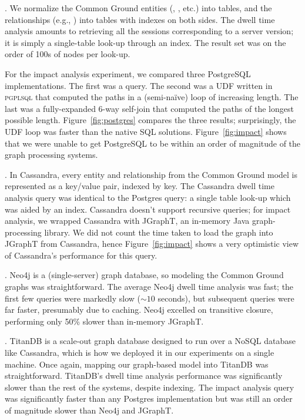 \documentclass{cidr-2017}
\begin{document}
. We normalize the Common Ground entities 
(\itemground, \version, etc.) into tables, and the relationships
(e.g., ) into tables with indexes on both sides. 
The dwell time analysis amounts to retrieving all the sessions corresponding to a server version; it is simply a single-table look-up through an index. The result set was on the order of 100s of nodes per look-up.

For the impact analysis experiment, we compared three PostgreSQL implementations. The first was a  query. 
The second was a UDF written in \textsc{pgplsql} that computed the paths in a (semi-naïve) loop of increasing length. 
The last was a fully-expanded 6-way self-join that computed the paths of the longest possible length. Figure~\ref{fig:postgres} compares the three results; surprisingly, the UDF loop was faster than the native SQL solutions. 
Figure~\ref{fig:impact} shows that we were unable to get PostgreSQL to be within an order of magnitude of the graph processing systems. 

. In Cassandra, every entity and relationship from the Common Ground model is represented as a key/value pair, indexed by key. 
The Cassandra dwell time analysis query was identical to the Postgres query: a single table look-up which was aided by an index.
Cassandra doesn't support recursive queries; for impact analysis, we wrapped Cassandra with JGraphT, an in-memory Java graph-processing library. We did not count the time taken to load the graph into JGraphT from Cassandra, hence Figure~\ref{fig:impact} shows a very optimistic view of Cassandra's performance for this query.

. Neo4j is a (single-server) graph database, so modeling the Common Ground graphs was straightforward.
The average Neo4j dwell time analysis was fast; the first few queries were markedly slow
(${\sim}10$ seconds),
but subsequent queries were far faster, presumably due to caching. 
Neo4j excelled on transitive closure, performing only 50\% slower than in-memory JGraphT.

. TitanDB is a scale-out graph database designed to run over a NoSQL database like Cassandra, which is how we deployed it in our experiments on a single machine. 
Once again, mapping our graph-based model into TitanDB was straightforward.
TitanDB's dwell time analysis performance was significantly slower than the rest of the systems, despite indexing.
The impact analysis query was significantly faster than any Postgres implementation but was still an order of magnitude slower than Neo4j and JGraphT. 
\end{document}
